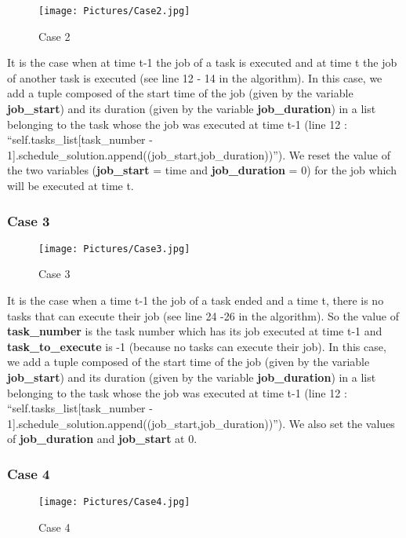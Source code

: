 \documentclass[a4paper,12pt]{article}
\begin{document}
\begin{figure}[h!]
  \centering
  \texttt{[image: Pictures/Case2.jpg]}
  \caption{Case 2}
  \label{fig: Case 2}
\end{figure}

\smallskip
\noindent
It is the case when at time t-1 the job of a task is executed and at time t the job of another task is executed (see line 12 - 14 in the algorithm). In this case, we add a tuple composed of the start time of the job (given by the variable \textbf{job\_start}) and its duration (given by the variable \textbf{job\_duration}) in a list belonging to the task whose the job was executed at time t-1 (line 12 : ``self.tasks\_list[task\_number - 1].schedule\_solution.append((job\_start,job\_duration))''). We reset the value of the two variables (\textbf{job\_start} = time and \textbf{job\_duration} = 0) for the job which will be executed at time t. 

\newpage
\subsubsection{Case 3}

\begin{figure}[h!]
  \centering
  \texttt{[image: Pictures/Case3.jpg]}
  \caption{Case 3}
  \label{fig: Case 3}
\end{figure}

\smallskip
\noindent
It is the case when a time t-1 the job of a task ended and a time t, there is no tasks that can execute their job (see line 24 -26 in the algorithm). So the value of \textbf{task\_number} is the task number which has its job executed at time t-1 and \textbf{task\_to\_execute} is -1 (because no tasks can execute their job). In this case, we add a tuple composed of the start time of the job (given by the variable \textbf{job\_start}) and its duration (given by the variable \textbf{job\_duration}) in a list belonging to the task whose the job was executed at time t-1 (line 12 : ``self.tasks\_list[task\_number - 1].schedule\_solution.append((job\_start,job\_duration))''). We also set the values of \textbf{job\_duration} and \textbf{job\_start} at 0.

\subsubsection{Case 4}

\begin{figure}[h!]
  \centering
  \texttt{[image: Pictures/Case4.jpg]}
  \caption{Case 4}
  \label{fig: Case 4}
\end{figure}
\end{document}
